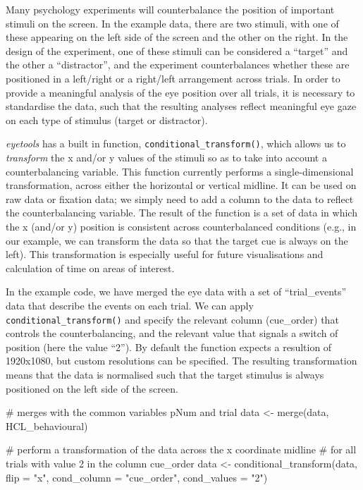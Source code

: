 \documentclass[
  man,
  floatsintext,
  longtable,
  nolmodern,
  notxfonts,
  notimes,
  colorlinks=true,linkcolor=blue,citecolor=blue,urlcolor=blue]{apa7}
\newenvironment{Shaded}{\begin{snugshade}}{\end{snugshade}}
\newcommand{\AttributeTok}[1]{\textcolor[rgb]{0.40,0.45,0.13}{#1}}
\newcommand{\CommentTok}[1]{\textcolor[rgb]{0.37,0.37,0.37}{#1}}
\newcommand{\FunctionTok}[1]{\textcolor[rgb]{0.28,0.35,0.67}{#1}}
\newcommand{\NormalTok}[1]{\textcolor[rgb]{0.00,0.23,0.31}{#1}}
\newcommand{\OtherTok}[1]{\textcolor[rgb]{0.00,0.23,0.31}{#1}}
\newcommand{\StringTok}[1]{\textcolor[rgb]{0.13,0.47,0.30}{#1}}
\begin{document}
Many psychology experiments will counterbalance the position of
important stimuli on the screen. In the example data, there are two
stimuli, with one of these appearing on the left side of the screen and
the other on the right. In the design of the experiment, one of these
stimuli can be considered a ``target'' and the other a ``distractor'',
and the experiment counterbalances whether these are positioned in a
left/right or a right/left arrangement across trials. In order to
provide a meaningful analysis of the eye position over all trials, it is
necessary to standardise the data, such that the resulting analyses
reflect meaningful eye gaze on each type of stimulus (target or
distractor).

\emph{eyetools} has a built in function,
\texttt{conditional\_transform()}, which allows us to \emph{transform}
the x and/or y values of the stimuli so as to take into account a
counterbalancing variable. This function currently performs a
single-dimensional transformation, across either the horizontal or
vertical midline. It can be used on raw data or fixation data; we simply
need to add a column to the data to reflect the counterbalancing
variable. The result of the function is a set of data in which the x
(and/or y) position is consistent across counterbalanced conditions
(e.g., in our example, we can transform the data so that the target cue
is always on the left). This transformation is especially useful for
future visualisations and calculation of time on areas of interest.

In the example code, we have merged the eye data with a set of
``trial\_events'' data that describe the events on each trial. We can
apply \texttt{conditional\_transform()} and specify the relevant column
(cue\_order) that controls the counterbalancing, and the relevant value
that signals a switch of position (here the value ``2''). By default the
function expects a resultion of 1920x1080, but custom resolutions can be
specified. The resulting transformation means that the data is
normalised such that the target stimulus is always positioned on the
left side of the screen.

\begin{Shaded}
\begin{Highlighting}[]
\CommentTok{\# merges with the common variables pNum and trial}
\NormalTok{data }\OtherTok{\textless{}{-}} \FunctionTok{merge}\NormalTok{(data, HCL\_behavioural) }

\CommentTok{\# perform a transformation of the data across the x coordinate midline}
\CommentTok{\# for all trials with value 2 in the column cue\_order}
\NormalTok{data }\OtherTok{\textless{}{-}} \FunctionTok{conditional\_transform}\NormalTok{(data, }
                              \AttributeTok{flip =} \StringTok{"x"}\NormalTok{, }
                              \AttributeTok{cond\_column =} \StringTok{"cue\_order"}\NormalTok{, }
                              \AttributeTok{cond\_values =} \StringTok{"2"}\NormalTok{) }
\end{Highlighting}
\end{Shaded}
\end{document}
